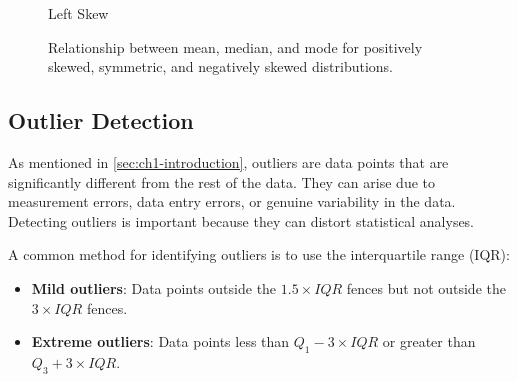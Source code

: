 \begin{figure}[htbp]
\begin{minipage}{0.32\textwidth}
    \end{minipage}
    \hfill
    \begin{minipage}{0.32\textwidth}
        \centering
        \par\small Left Skew
    \end{minipage}
    \caption{Relationship between mean, median, and mode for positively skewed, symmetric, and negatively skewed distributions.}
    \label{fig:skew_mean_median_mode}
\end{figure}

\subsection*{Outlier Detection}

As mentioned in \autoref{sec:ch1-introduction}, outliers are data points that are significantly different from the rest of the data. They can arise due to measurement errors, data entry errors, or genuine variability in the data. Detecting outliers is important because they can distort statistical analyses.

A common method for identifying outliers is to use the interquartile range (IQR):

\begin{itemize}
    \item \textbf{Mild outliers}: Data points outside the $1.5\times IQR$ fences but not outside the $3\times IQR$ fences.
    \item \textbf{Extreme outliers}: Data points less than $Q_1 - 3 \times IQR$ or greater than $Q_3 + 3 \times IQR$.
\end{itemize}

